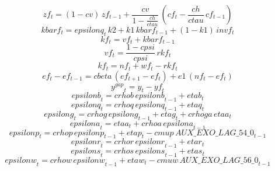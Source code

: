 \begin{dmath}
{zf}_{t}=\left(1-{cv}\right)\, {zf}_{t-1}+\frac{{cv}}{1-\frac{{ch}}{{ctau}}}\, \left({cf}_{t}-\frac{{ch}}{{ctau}}\, {cf}_{t-1}\right)
\end{dmath}
\begin{dmath}
{kbarf}_{t}={epsilonq}_{t}\, {k2}+{k1}\, {kbarf}_{t-1}+\left(1-{k1}\right)\, {invf}_{t}
\end{dmath}
\begin{dmath}
{kf}_{t}={vf}_{t}+{kbarf}_{t-1}
\end{dmath}
\begin{dmath}
{vf}_{t}=\frac{1-{cpsi}}{{cpsi}}\, {rkf}_{t}
\end{dmath}
\begin{dmath}
{kf}_{t}={nf}_{t}+{wf}_{t}-{rkf}_{t}
\end{dmath}
\begin{dmath}
{ef}_{t}-{ef}_{t-1}={cbeta}\, \left({ef}_{t+1}-{ef}_{t}\right)+{e1}\, \left({nf}_{t}-{ef}_{t}\right)
\end{dmath}
\begin{dmath}
{{y^{gap}}}_{t}={{y}}_{t}-{yf}_{t}
\end{dmath}
\begin{dmath}
{epsilonb}_{t}={crhob}\, {epsilonb}_{t-1}+{etab}_{t}
\end{dmath}
\begin{dmath}
{epsilonq}_{t}={crhoq}\, {epsilonq}_{t-1}+{etaq}_{t}
\end{dmath}
\begin{dmath}
{epsilong}_{t}={crhog}\, {epsilong}_{t-1}+{etag}_{t}+{crhoga}\, {etaa}_{t}
\end{dmath}
\begin{dmath}
{epsilona}_{t}={etaa}_{t}+{crhoa}\, {epsilona}_{t-1}
\end{dmath}
\begin{dmath}
{epsilonp}_{t}={crhop}\, {epsilonp}_{t-1}+{etap}_{t}-{cmup}\, {AUX\_EXO\_LAG\_54\_0}_{t-1}
\end{dmath}
\begin{dmath}
{epsilonr}_{t}={crhor}\, {epsilonr}_{t-1}+{etar}_{t}
\end{dmath}
\begin{dmath}
{epsilons}_{t}={crhos}\, {epsilons}_{t-1}+{etas}_{t}
\end{dmath}
\begin{dmath}
{epsilonw}_{t}={crhow}\, {epsilonw}_{t-1}+{etaw}_{t}-{cmuw}\, {AUX\_EXO\_LAG\_56\_0}_{t-1}
\end{dmath}
